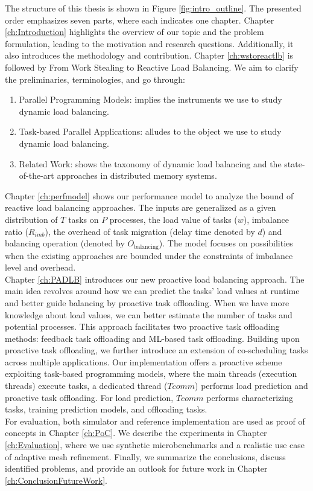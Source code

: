 The structure of this thesis is shown in Figure \ref{fig:intro_outline}. The presented order emphasizes seven parts, where each indicates one chapter. Chapter \ref{ch:Introduction} highlights the overview of our topic and the problem formulation, leading to the motivation and research questions. Additionally, it also introduces the methodology and contribution. Chapter \ref{ch:wstoreactlb} is followed by From Work Stealing to Reactive Load Balancing. We aim to clarify the preliminaries, terminologies, and go through:
\begin{enumerate}
	\item Parallel Programming Models: implies the instruments we use to study dynamic load balancing.
	\item Task-based Parallel Applications: alludes to the object we use to study dynamic load balancing.
	\item Related Work: shows the taxonomy of dynamic load balancing and the state-of-the-art approaches in distributed memory systems. %
\end{enumerate}

Chapter \ref{ch:perfmodel} shows our performance model to analyze the bound of reactive load balancing approaches. The inputs are generalized as a given distribution of $T$ tasks on $P$ processes, the load value of tasks ($w$), imbalance ratio ($R_{imb}$), the overhead of task migration (delay time denoted by $d$) and balancing operation (denoted by $O_{\text{balancing}}$). The model focuses on possibilities when the existing approaches are bounded under the constraints of imbalance level and overhead. \\

Chapter \ref{ch:PADLB} introduces our new proactive load balancing approach. The main idea revolves around how we can predict the tasks' load values at runtime and better guide balancing by proactive task offloading. When we have more knowledge about load values, we can better estimate the number of tasks and potential processes. This approach facilitates two proactive task offloading methods: feedback task offloading and ML-based task offloading. Building upon proactive task offloading, we further introduce an extension of co-scheduling tasks across multiple applications. Our implementation offers a proactive scheme exploiting task-based programming models, where the main threads (execution threads) execute tasks, a dedicated thread ($Tcomm$) performs load prediction and proactive task offloading. For load prediction, $Tcomm$ performs characterizing tasks, training prediction models, and offloading tasks.\\

For evaluation, both simulator and reference implementation are used as proof of concepts in Chapter \ref{ch:PoC}. We describe the experiments in Chapter \ref{ch:Evaluation}, where we use synthetic microbenchmarks and a realistic use case of adaptive mesh refinement. Finally, we summarize the conclusions, discuss identified problems, and provide an outlook for future work in Chapter \ref{ch:ConclusionFutureWork}.\\
